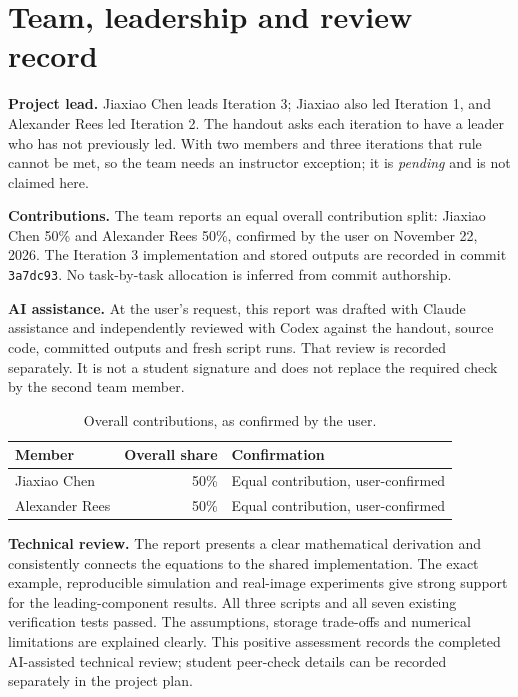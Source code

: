 \documentclass[11pt,letterpaper]{article}
\numberwithin{equation}{section}
\newcommand{\fn}[1]{\texttt{#1}}
\begin{document}
\section{Team, leadership and review record}\label{sec:team}

\textbf{Project lead.} Jiaxiao Chen leads Iteration 3; Jiaxiao also led Iteration 1, and Alexander Rees led Iteration 2. The handout asks each iteration to have a leader who has not previously led. With two members and three iterations that rule cannot be met, so the team needs an instructor exception; it is \emph{pending} and is not claimed here.

\textbf{Contributions.} The team reports an equal overall contribution split: Jiaxiao Chen 50\% and Alexander Rees 50\%, confirmed by the user on November 22, 2026. The Iteration 3 implementation and stored outputs are recorded in commit \fn{3a7dc93}. No task-by-task allocation is inferred from commit authorship.

\textbf{AI assistance.} At the user's request, this report was drafted with Claude assistance and independently reviewed with Codex against the handout, source code, committed outputs and fresh script runs. That review is recorded separately. It is not a student signature and does not replace the required check by the second team member.

\begin{table}[H]
\centering\small
\caption{Overall contributions, as confirmed by the user.}
\label{tab:contrib}
\begin{tabularx}{\linewidth}{@{}L r L@{}}\toprule
Member & Overall share & Confirmation\\\midrule
Jiaxiao Chen & 50\% & Equal contribution, user-confirmed\\
Alexander Rees & 50\% & Equal contribution, user-confirmed\\\bottomrule
\end{tabularx}
\end{table}
\textbf{Technical review.} The report presents a clear mathematical derivation and consistently connects the equations to the shared implementation. The exact example, reproducible simulation and real-image experiments give strong support for the leading-component results. All three scripts and all seven existing verification tests passed. The assumptions, storage trade-offs and numerical limitations are explained clearly. This positive assessment records the completed AI-assisted technical review; student peer-check details can be recorded separately in the project plan.
\end{document}
